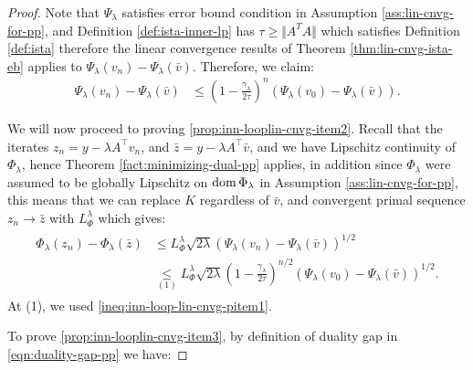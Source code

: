 \documentclass[12pt]{article}
\begin{document}
        \begin{proof}
            Note that $\Psi_\lambda$ satisfies error bound condition in Assumption \ref{ass:lin-cnvg-for-pp}, and Definition \ref{def:ista-inner-lp} has $\tau \ge \Vert A^TA\Vert$ which satisfies Definition \ref{def:ista} therefore the linear convergence results of Theorem \ref{thm:lin-cnvg-ista-eb} applies to $\Psi_\lambda(v_n) - \Psi_\lambda(\bar v)$. 
            Therefore, we claim: 
            \begin{align}\label{ineq:inn-loop-lin-cnvg-pitem1}
                \Psi_\lambda(v_n) - \Psi_\lambda(\bar v) &\le 
                \left(
                    1 - \frac{\gamma_\lambda}{2\tau}
                \right)^n
                \left(
                    \Psi_\lambda(v_0) - \Psi_\lambda(\bar v)
                \right). 
            \end{align}
            \par
            We will now proceed to proving \ref{prop:inn-looplin-cnvg-item2}. 
            Recall that the iterates $z_n = y - \lambda A^\top v_n$, and $\bar z = y - \lambda A^\top \bar v$, and we have Lipschitz continuity of $\Phi_\lambda$, hence Theorem \ref{fact:minimizing-dual-pp} applies, in addition since $\Phi_\lambda$ were assumed to be globally Lipschitz on $\operatorname{dom} \Phi_\lambda$ in Assumption \ref{ass:lin-cnvg-for-pp}, this means that we can replace $K$ regardless of $\bar v$, and convergent primal sequence $z_n \rightarrow \bar z$ with $L_\Phi^\lambda$ which gives: 
            \begin{align}\label{ineq:inn-loop-lin-cnvg-pitem2}
                \begin{split}
                    \Phi_\lambda(z_n) - \Phi_\lambda(\bar z) &\le L_\Phi^\lambda \sqrt{2\lambda}\left(
                    \Psi_\lambda(v_n) - \Psi_\lambda (\bar v)
                    \right)^{1/2}
                    \\
                    &\underset{(1)}{\le} 
                    L_\Phi^\lambda\sqrt{2\lambda} \left(
                        1 - \frac{\gamma_\lambda}{2\tau}
                    \right)^{n/2}\left(
                        \Psi_\lambda(v_0) - \Psi_\lambda(\bar v)
                    \right)^{1/2}. 
                \end{split}
            \end{align}
            At (1), we used \eqref{ineq:inn-loop-lin-cnvg-pitem1}.
            \par
            To prove \ref{prop:inn-looplin-cnvg-item3}, by definition of duality gap in \eqref{eqn:duality-gap-pp} we have:

\end{proof}
\end{document}

